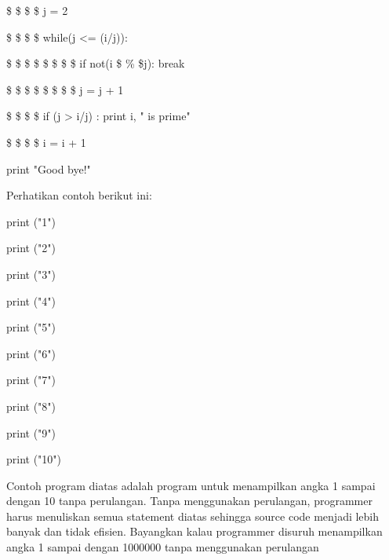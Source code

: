 \vspace{\baselineskip}
 \$  \$  \$  \$ j = 2 \par
\noindent 
\vspace{\baselineskip}
 \$  \$  \$  \$ while(j <= (i/j)): \par
\noindent 
\vspace{\baselineskip}
 \$  \$  \$  \$  \$  \$  \$  \$ if not(i \$  \%  \$j): break \par
\noindent 
\vspace{\baselineskip}
 \$  \$  \$  \$  \$  \$  \$  \$ j = j + 1 \par
\noindent 
\vspace{\baselineskip}
 \$  \$  \$  \$ if (j > i/j) : print i, " is prime" \par
\noindent 
\vspace{\baselineskip}
 \$  \$  \$  \$ i = i + 1 \par
\noindent 
\vspace{\baselineskip}
\vspace{\baselineskip}
print "Good bye!" \par
\vspace{12pt}
\vspace{12pt}
Perhatikan contoh berikut ini:\vspace{\baselineskip}
\vspace{\baselineskip}
 \par
\vspace{12pt}
print ("1") \par
print ("2") \par
print ("3") \par
print ("4") \par
print ("5") \par
print ("6") \par
print ("7") \par
print ("8") \par
print ("9") \par
print ("10") \par
\vspace{12pt}
\vspace{\baselineskip}
Contoh program diatas adalah program untuk menampilkan angka 1 sampai dengan 10 tanpa perulangan. Tanpa menggunakan perulangan, programmer harus menuliskan semua statement diatas sehingga source code menjadi lebih banyak dan tidak efisien. Bayangkan kalau programmer disuruh menampilkan angka 1 sampai dengan 1000000 tanpa menggunakan perulangan\vspace{\baselineskip}

